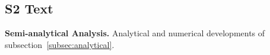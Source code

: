 \documentclass[10pt,letterpaper,draft]{article}
\begin{document}
\subsection*{S2 Text}
\label{S2_Text}
{\bf Semi-analytical Analysis.} Analytical and numerical developments of subsection~\ref{subsec:analytical}.











\nolinenumbers

%
%
% 



















\end{document}
